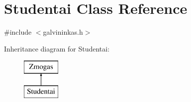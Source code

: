 \hypertarget{class_studentai}{}\section{Studentai Class Reference}
\label{class_studentai}


{\ttfamily \#include $<$galvininkas.\+h$>$}

Inheritance diagram for Studentai\+:\begin{figure}[H]
\begin{center}
\leavevmode
\includegraphics[height=2.000000cm]{class_studentai}
\end{center}
\end{figure}
